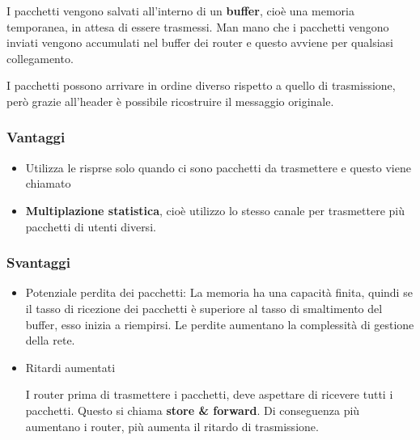 \documentclass[a4paper]{article}
\begin{document}
\noindent I pacchetti vengono salvati all'interno di un \textbf{buffer}, cioè una
memoria temporanea, in attesa di essere trasmessi. Man mano che i pacchetti
vengono inviati vengono accumulati nel buffer dei router e questo avviene per
qualsiasi collegamento.
\label{09-10-D8}

\noindent
I pacchetti possono arrivare in ordine diverso rispetto a quello di trasmissione,
però grazie all'header è possibile ricostruire il messaggio originale.

\subsubsection{Vantaggi}
\begin{itemize}
  \item Utilizza le risprse solo quando ci sono pacchetti da trasmettere e questo
    viene chiamato
  \item \textbf{Multiplazione statistica}, cioè utilizzo lo stesso
    canale per trasmettere più pacchetti di utenti diversi.
\end{itemize}

\subsubsection{Svantaggi}
\begin{itemize}
  \item Potenziale perdita dei pacchetti: La memoria ha una capacità finita,
    quindi se il tasso di ricezione dei pacchetti è superiore al tasso di
    smaltimento del buffer, esso inizia a riempirsi. Le perdite aumentano la
    complessità di gestione della rete.

  \item Ritardi aumentati

    \noindent
    I router prima di trasmettere i pacchetti, deve aspettare di ricevere tutti
    i pacchetti. Questo si chiama \textbf{store \& forward}. Di conseguenza
    più aumentano i router, più aumenta il ritardo di trasmissione.
    \label{09-10-D9}
\end{itemize}
\end{document}
